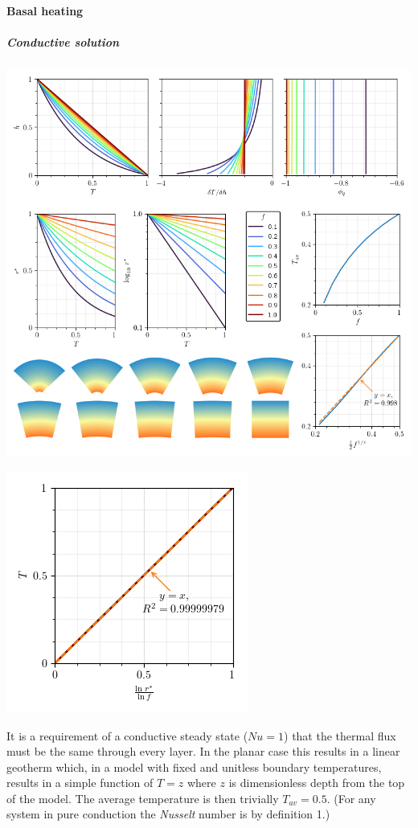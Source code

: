 \documentclass[a4paper,11pt,oneside]{book}
\begin{document}
\paragraph{Basal heating}

\subparagraph{Conductive solution}

\includegraphics[width=0.7\linewidth]{files/7f673a8edbf6184fb731e1f10b346ed0.png}

\includegraphics[width=0.7\linewidth]{files/1fa833915eb9bd27a143f7b2082136f6.png}

It is a requirement of a conductive steady state ($Nu=1$) that the thermal flux must be the same through every layer. In the planar case this results in a linear geotherm which, in a model with fixed and unitless boundary temperatures, results in a simple function of $T = z$ where $z$ is dimensionless depth from the top of the model. The average temperature is then trivially $T_{av}=0.5$. (For any system in pure conduction the \textit{Nusselt} number is by definition 1.)
\end{document}
